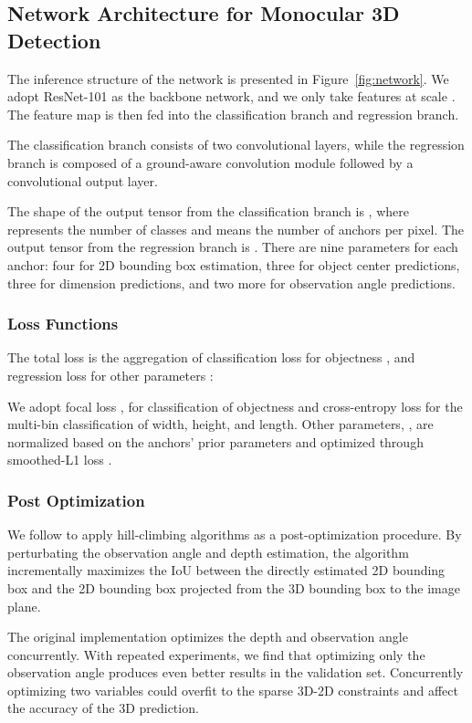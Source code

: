 \documentclass[letterpaper, 10 pt, journal, twoside]{IEEEtran}
\begin{document}
\subsection{Network Architecture for Monocular 3D Detection}

The inference structure of the network is presented in Figure~\ref{fig:network}.
We adopt ResNet-101 \cite{He2015Resnet} as the backbone network, and we only take features at scale .
The feature map is then fed into the classification branch and regression branch.

The classification branch consists of two convolutional layers, while the regression branch is composed of a ground-aware convolution module followed by a convolutional output layer.

The shape of the output tensor from the classification branch  is , where  represents the number of classes and  means the number of anchors per pixel.
    The output tensor from the regression branch is .
      There are nine parameters for each anchor: four for 2D bounding box estimation, three for object center predictions, three for dimension predictions, and two more for observation angle predictions.

\subsubsection{Loss Functions}

The total loss  is the aggregation of classification loss for objectness , and regression loss for other parameters :

We adopt focal loss \cite{Yun2018Focal}, \cite{Lin2018Focal} for classification of objectness and cross-entropy loss for the multi-bin classification
of width, height, and length.
Other parameters, ,
are normalized based on the anchors' prior parameters and optimized through smoothed-L1 loss \cite{Girshick2015Fastrcnn}.

\subsubsection{Post Optimization}
We follow \cite{Brazil2019M3DRPN} to apply hill-climbing algorithms as a post-optimization procedure.
By perturbating the observation angle and depth estimation,
the algorithm incrementally maximizes the IoU between the directly estimated 2D bounding box and the 2D bounding box projected from the 3D bounding box to the image plane.

The original implementation optimizes the depth and observation angle concurrently.
With repeated experiments, we find that optimizing only the observation angle produces even better results in the validation set. Concurrently optimizing two variables could overfit to the sparse 3D-2D constraints and affect the accuracy of the 3D prediction.
\end{document}
